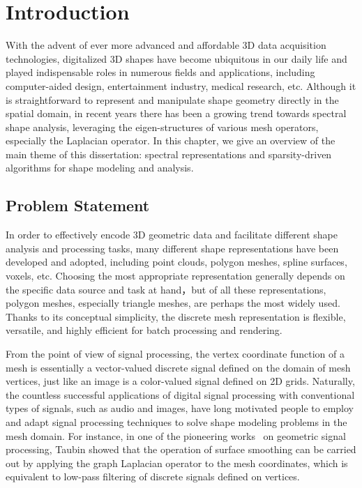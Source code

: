 \chapter{Introduction}

With the advent of ever more advanced and affordable 3D data acquisition
technologies, digitalized 3D shapes have become ubiquitous in our daily
life and played indispensable roles in numerous fields and applications,
including computer-aided design, entertainment industry, medical research, etc.
Although it is straightforward to represent and manipulate shape geometry
directly in the spatial domain, in recent years there has been a growing trend
towards spectral shape analysis, leveraging the eigen-structures of various mesh
operators, especially the Laplacian operator. In this chapter, we give an overview of
the main theme of this dissertation: spectral representations and sparsity-driven
algorithms for shape modeling and analysis.

\section{Problem Statement}

In order to effectively encode 3D geometric data and facilitate different
shape analysis and processing tasks, many different shape representations have
been developed and adopted, including point clouds, polygon meshes, spline surfaces,
voxels, etc. Choosing the most appropriate representation generally depends on the
specific data source and task at hand，but of all these representations,
polygon meshes, especially triangle meshes, are perhaps the most widely used.
Thanks to its conceptual simplicity, the discrete mesh representation is flexible, versatile,
and highly efficient for batch processing and rendering.

From the point of view of signal processing, the vertex coordinate function of
a mesh is essentially a vector-valued discrete signal defined on the domain of
mesh vertices, just like an image is a color-valued signal defined on 2D grids.
Naturally, the countless successful applications of digital signal processing with conventional
types of signals, such as audio and images, have long motivated people to employ 
and adapt signal processing techniques to solve shape modeling problems in the 
mesh domain. For instance, in one of the pioneering works~\cite{Taubin1995} on 
geometric signal processing, Taubin showed that the operation of surface smoothing 
can be carried out by applying the graph Laplacian operator to the mesh coordinates, 
which is equivalent to low-pass filtering of discrete signals defined on vertices.

